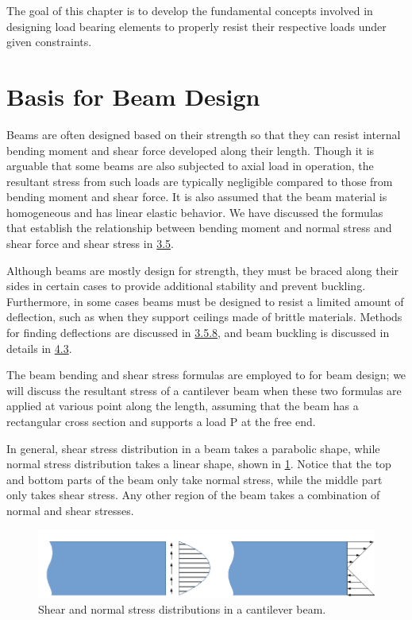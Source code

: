 \documentclass[a4paper,openany,12pt]{book}
\begin{document}
{{The goal of this chapter is to develop the fundamental concepts involved
in designing load bearing elements to properly resist their respective
loads under given constraints.

\section{Basis for Beam Design}
\label{basis-for-beam-design}
Beams are often designed based on their strength so that they can resist
internal bending moment and shear force developed along their length.
Though it is arguable that some beams are also subjected to axial load
in operation, the resultant stress from such loads are typically
negligible compared to those from bending moment and shear force. It is
also assumed that the beam material is homogeneous and has linear
elastic behavior. We have discussed the formulas that establish the
relationship between bending moment and normal stress and shear force
and shear stress in \hyperref[section: bending]{3.5}.

Although beams are mostly design for strength, they must be braced along
their sides in certain cases to provide additional stability and prevent
buckling. Furthermore, in some cases beams must be designed to resist a
limited amount of deflection, such as when they support ceilings made of
brittle materials. Methods for finding deflections are discussed in
\hyperref[subsection: beam deflection]{3.5.8}, and beam buckling is discussed
in details in \hyperref[section: buckling]{4.3}.

The beam bending and shear stress formulas are employed to for beam
design; we will discuss the resultant stress of a cantilever beam when
these two formulas are applied at various point along the length,
assuming that the beam has a rectangular cross section and supports a
load P at the free end.

In general, shear stress distribution in a beam takes a parabolic shape,
while normal stress distribution takes a linear shape, shown in
\ref{fig: stress in beam}. Notice that the top and
bottom parts of the beam only take normal stress, while the middle part
only takes shear stress. Any other region of the beam takes a
combination of normal and shear stresses.


\begin{figure}[htbp]
\centering
\includegraphics[width=.9\linewidth]{pictures/Simple-load-bearing/stress-in-beam.pdf}
\caption{\label{fig: stress in beam}Shear and normal stress distributions in a cantilever beam.}
\end{figure}

}}
\end{document}
